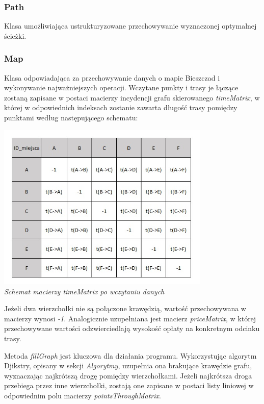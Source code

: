 \documentclass{article}
\begin{document}
\subsubsection{Path}
Klasa umożliwiająca ustrukturyzowane przechowywanie wyznaczonej optymalnej ścieżki.

\subsubsection{Map}
Klasa odpowiadająca za przechowywanie danych o mapie Bieszczad i wykonywanie najważniejszych operacji. Wczytane punkty i trasy je łączące zostaną zapisane w postaci macierzy incydencji grafu skierowanego \textit{timeMatrix}, w której w odpowiednich indeksach zostanie zawarta długość trasy pomiędzy punktami według następującego schematu:

\begin{center}
    \includegraphics[height=8cm]{timeMatrix.jpg} \\
    \textit{Schemat macierzy timeMatrix po wczytaniu danych}
\end{center}

Jeżeli dwa wierzchołki nie są połączone krawędzią, wartość przechowywana w macierzy wynosi \textit{-1}. Analogicznie uzupełniana jest macierz \textit{priceMatrix}, w której przechowywane wartości odzwierciedlają wysokość opłaty na konkretnym odcinku trasy.

Metoda \textit{fillGraph} jest kluczowa dla działania programu. Wykorzystując algorytm Djikstry, opisany w sekcji \textit{Algorytmy}, uzupełnia ona brakujące krawędzie grafu, wyznaczając najkrótszą drogę pomiędzy wierzchołkami. Jeżeli najkrótsza droga przebiega przez inne wierzchołki, zostają one zapisane w postaci listy liniowej w odpowiednim polu macierzy \textit{pointsThroughMatrix}. 
\end{document}
